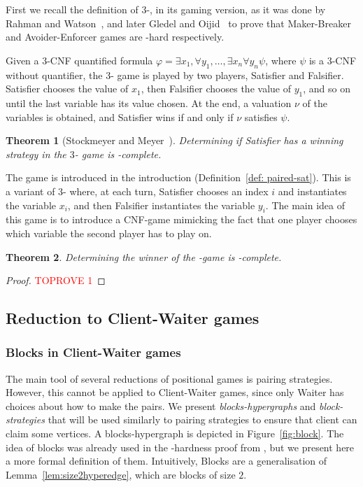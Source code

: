 \documentclass{article}
\newcommand{\PS}{\lang{Paired~SAT}\xspace}
\newcommand{\QBF}{\lang{QBF}\xspace}
\newtheorem{theorem}{Theorem}
\begin{document}
First we recall the definition of 3-\QBF, in its gaming version, as it was done by Rahman and Watson~\cite{RW21}, and later Gledel and Oijid~\cite{GO23} to prove that Maker-Breaker and Avoider-Enforcer games are \PSPACE-hard respectively.

Given a 3-CNF quantified formula $\varphi = \exists x_1, \forall y_1, \dots, \exists x_{n} \forall y_{n} \psi$, where $\psi$ is a $3$-CNF without quantifier, the 3-\QBF game is played by two players, Satisfier and Falsifier. Satisfier chooses the value of $x_1$, then Falsifier chooses the value of $y_1$, and so on until the last variable has its value chosen. At the end, a valuation $\nu$ of the variables is obtained, and Satisfier wins if and only if $\nu$ satisfies $\psi$.

\begin{theorem}[Stockmeyer and Meyer~\cite{SM73}]\label{QBF PSPACE COMPLETE}
Determining if Satisfier has a winning strategy in the $3$-\QBF game is \PSPACE-complete.
\end{theorem}

The game \PS is introduced in the introduction (Definition~\ref{def: paired-sat}). This is a variant of \(3\)-\QBF where, at each turn, Satisfier chooses an index \(i\) and instantiates the variable \(x_i\), and then Falsifier instantiates the variable \(y_i\). The main idea of this game is to introduce a CNF-game mimicking the fact that one player chooses which variable the second player has to play on.



\begin{theorem}
    Determining the winner of the \PS-game is \PSPACE-complete.
\end{theorem}

\begin{proof}\textcolor{red}{TOPROVE 1}\end{proof}


\subsection{Reduction to Client-Waiter games}

\subsubsection{Blocks in Client-Waiter games}\label{subsection blocks}

The main tool of several reductions of positional games is pairing strategies. However, this cannot be applied to Client-Waiter games, since only Waiter has choices about how to make the pairs. We present {\em blocks-hypergraphs} and {\em block-strategies} that will be used similarly to pairing strategies to ensure that client can claim some vertices. A blocks-hypergraph is depicted in Figure~\ref{fig:block}. The idea of blocks was already used in the \NP-hardness proof from \cite{CMP11}, but we present here a more formal definition of them. Intuitively, Blocks are a generalisation of Lemma~\ref{lem:size2hyperedge}, which are blocks of size $2$.
\end{document}
